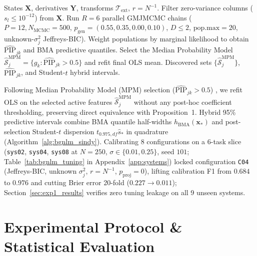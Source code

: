 \documentclass{article}
\begin{document}
\begin{algorithm}[t]
\caption{Tuned BGNLM-SINDy via Parallel GMJMCMC}
\label{alg:bgnlm_sindy}
\begin{small}
\begin{algorithmic}[1]
\Require States $\boldsymbol{X}$, derivatives $\boldsymbol{Y}$, transforms $\mathcal{T}_{\text{ext}}$, $r=N^{-1}$.
\State Filter zero-variance columns ($s_l \le 10^{-12}$) from $\boldsymbol{X}$.
  \State Run $R=6$ parallel GMJMCMC chains ($P=12, N_{\text{MCMC}}=500$, $p_{\text{gen}}=(0.55, 0.35, 0.00, 0.10)$, $D \le 2$, $\text{pop.max}=20$, unknown-$\sigma_j^2$ Jeffreys-BIC).
  \State Weight populations by marginal likelihood to obtain $\widehat{\text{PIP}}_{jk}$ and BMA predictive quantiles.
  \State Select the Median Probability Model $\hat{\mathcal{S}}_j^{\text{MPM}} = \{g_k : \widehat{\text{PIP}}_{jk} > 0.5\}$ and refit final OLS mean.
\EndFor
\State \Return Discovered sets $\{\hat{\mathcal{S}}_j^{\text{MPM}}\}$, $\widehat{\text{PIP}}_{jk}$, and Student-$t$ hybrid intervals.
\end{algorithmic}
\end{small}
\end{algorithm}

Following Median Probability Model (MPM) selection ($\widehat{\text{PIP}}_{jk} > 0.5$) \citep{barbieri2004optimal}, we refit OLS on the selected active features $\hat{\mathcal{S}}_j^{\text{MPM}}$ without any post-hoc coefficient thresholding, preserving direct equivalence with Proposition~1. Hybrid 95\% predictive intervals combine BMA quantile half-widths $h_{\text{BMA}}(\boldsymbol{x}_*)$ and post-selection Student-$t$ dispersion $t_{0.975, df}\hat{s}_*$ in quadrature (Algorithm~\ref{alg:bgnlm_sindy}). Calibrating 8 configurations on a 6-task slice (\texttt{sys02}, \texttt{sys04}, \texttt{sys08} at $N=250$, $\sigma \in \{0.01,0.25\}$, seed $101$; Table~\ref{tab:bgnlm_tuning} in Appendix~\ref{app:systems}) locked configuration \texttt{C04} (Jeffreys-BIC, unknown $\sigma_j^2$, $r=N^{-1}$, $p_{\text{proj}}=0$), lifting calibration F1 from $0.684$ to $0.976$ and cutting Brier error 20-fold ($0.227 \to 0.011$); Section~\ref{sec:exp1_results} verifies zero tuning leakage on all 9 unseen systems.

\section{Experimental Protocol \& Statistical Evaluation}
\end{document}
